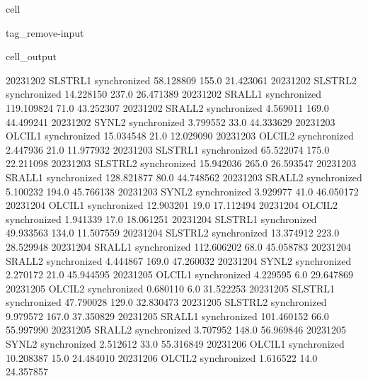 \documentclass[letterpaper,10pt,english]{jupyterBook}
\begin{document}
\begin{sphinxuseclass}{cell}
\begin{sphinxuseclass}{tag_remove-input}
\begin{sphinxVerbatimOutput}
\begin{sphinxuseclass}{cell_output}
\begin{sphinxVerbatim}[commandchars=\\\{\}]
2023\PYGZhy{}12\PYGZhy{}02     SLSTR\PYGZus{}L1  synchronized   58.128809   155.0   21.423061
2023\PYGZhy{}12\PYGZhy{}02     SLSTR\PYGZus{}L2  synchronized   14.228150   237.0   26.471389
2023\PYGZhy{}12\PYGZhy{}02      SRAL\PYGZus{}L1  synchronized  119.109824    71.0   43.252307
2023\PYGZhy{}12\PYGZhy{}02      SRAL\PYGZus{}L2  synchronized    4.569011   169.0   44.499241
2023\PYGZhy{}12\PYGZhy{}02       SYN\PYGZus{}L2  synchronized    3.799552    33.0   44.333629
2023\PYGZhy{}12\PYGZhy{}03      OLCI\PYGZus{}L1  synchronized   15.034548    21.0   12.029090
2023\PYGZhy{}12\PYGZhy{}03      OLCI\PYGZus{}L2  synchronized    2.447936    21.0   11.977932
2023\PYGZhy{}12\PYGZhy{}03     SLSTR\PYGZus{}L1  synchronized   65.522074   175.0   22.211098
2023\PYGZhy{}12\PYGZhy{}03     SLSTR\PYGZus{}L2  synchronized   15.942036   265.0   26.593547
2023\PYGZhy{}12\PYGZhy{}03      SRAL\PYGZus{}L1  synchronized  128.821877    80.0   44.748562
2023\PYGZhy{}12\PYGZhy{}03      SRAL\PYGZus{}L2  synchronized    5.100232   194.0   45.766138
2023\PYGZhy{}12\PYGZhy{}03       SYN\PYGZus{}L2  synchronized    3.929977    41.0   46.050172
2023\PYGZhy{}12\PYGZhy{}04      OLCI\PYGZus{}L1  synchronized   12.903201    19.0   17.112494
2023\PYGZhy{}12\PYGZhy{}04      OLCI\PYGZus{}L2  synchronized    1.941339    17.0   18.061251
2023\PYGZhy{}12\PYGZhy{}04     SLSTR\PYGZus{}L1  synchronized   49.933563   134.0   11.507559
2023\PYGZhy{}12\PYGZhy{}04     SLSTR\PYGZus{}L2  synchronized   13.374912   223.0   28.529948
2023\PYGZhy{}12\PYGZhy{}04      SRAL\PYGZus{}L1  synchronized  112.606202    68.0   45.058783
2023\PYGZhy{}12\PYGZhy{}04      SRAL\PYGZus{}L2  synchronized    4.444867   169.0   47.260032
2023\PYGZhy{}12\PYGZhy{}04       SYN\PYGZus{}L2  synchronized    2.270172    21.0   45.944595
2023\PYGZhy{}12\PYGZhy{}05      OLCI\PYGZus{}L1  synchronized    4.229595     6.0   29.647869
2023\PYGZhy{}12\PYGZhy{}05      OLCI\PYGZus{}L2  synchronized    0.680110     6.0   31.522253
2023\PYGZhy{}12\PYGZhy{}05     SLSTR\PYGZus{}L1  synchronized   47.790028   129.0   32.830473
2023\PYGZhy{}12\PYGZhy{}05     SLSTR\PYGZus{}L2  synchronized    9.979572   167.0   37.350829
2023\PYGZhy{}12\PYGZhy{}05      SRAL\PYGZus{}L1  synchronized  101.460152    66.0   55.997990
2023\PYGZhy{}12\PYGZhy{}05      SRAL\PYGZus{}L2  synchronized    3.707952   148.0   56.969846
2023\PYGZhy{}12\PYGZhy{}05       SYN\PYGZus{}L2  synchronized    2.512612    33.0   55.316849
2023\PYGZhy{}12\PYGZhy{}06      OLCI\PYGZus{}L1  synchronized   10.208387    15.0   24.484010
2023\PYGZhy{}12\PYGZhy{}06      OLCI\PYGZus{}L2  synchronized    1.616522    14.0   24.357857

\end{sphinxVerbatim}
\end{sphinxuseclass}
\end{sphinxVerbatimOutput}
\end{sphinxuseclass}
\end{sphinxuseclass}
\end{document}

